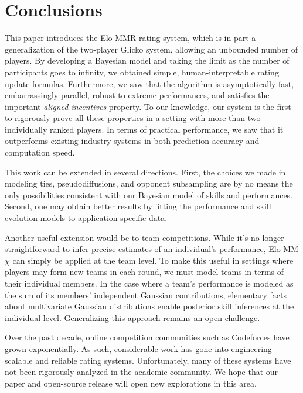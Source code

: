 
\section{Conclusions}
This paper introduces the Elo-MMR rating system, which is in part a generalization of the two-player Glicko system, allowing an unbounded number of players. By developing a Bayesian model and taking the limit as the number of participants goes to infinity, we obtained simple, human-interpretable rating update formulas. Furthermore, we saw that the algorithm is asymptotically fast, embarrassingly parallel, robust to extreme performances, and satisfies the important \emph{aligned incentives} property. To our knowledge, our system is the first to rigorously prove all these properties in a setting with more than two individually ranked players. In terms of practical performance, we saw that it outperforms existing industry systems in both prediction accuracy and computation speed.

This work can be extended in several directions. First, the choices we made in modeling ties, pseudodiffusions, and opponent subsampling are by no means the only possibilities consistent with our Bayesian model of skills and performances. Second, one may obtain better results by fitting the performance and skill evolution models to application-specific data.

Another useful extension would be to team competitions. While it's no longer straightforward to infer precise estimates of an individual's performance, Elo-MM$\chi$ can simply be applied at the team level. To make this useful in settings where players may form new teams in each round, we must model teams in terms of their individual members. In the case where a team's performance is modeled as the sum of its members' independent Gaussian contributions, elementary facts about multivariate Gaussian distributions enable posterior skill inferences at the individual level. Generalizing this approach remains an open challenge.


Over the past decade, online competition communities such as Codeforces have grown exponentially. As such, considerable work has gone into engineering scalable and reliable rating systems. Unfortunately, many of these systems have not been rigorously analyzed in the academic community. We hope that our paper and open-source release will open new explorations in this area.

